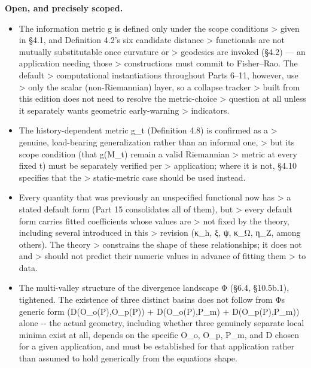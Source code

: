 \documentclass[
]{article}
\begin{document}
\textbf{Open, and precisely scoped.}

\begin{itemize}
\item
  The information metric g is defined only under the scope conditions
  \textgreater{} given in §4.1, and Definition 4.2's six candidate
  distance \textgreater{} functionals are not mutually substitutable
  once curvature or \textgreater{} geodesics are invoked (§4.2) --- an
  application needing those \textgreater{} constructions must commit to
  Fisher--Rao. The default \textgreater{} computational instantiations
  throughout Parts 6--11, however, use \textgreater{} only the scalar
  (non-Riemannian) layer, so a collapse tracker \textgreater{} built
  from this edition does not need to resolve the metric-choice
  \textgreater{} question at all unless it separately wants geometric
  early-warning \textgreater{} indicators.
\item
  The history-dependent metric g\_t (Definition 4.8) is confirmed as a
  \textgreater{} genuine, load-bearing generalization rather than an
  informal one, \textgreater{} but its scope condition (that g(M\_t)
  remain a valid Riemannian \textgreater{} metric at every fixed t) must
  be separately verified per \textgreater{} application; where it is
  not, §4.10 specifies that the \textgreater{} static-metric case should
  be used instead.
\item
  Every quantity that was previously an unspecified functional now has
  \textgreater{} a stated default form (Part 15 consolidates all of
  them), but \textgreater{} every default form carries fitted
  coefficients whose values are \textgreater{} not fixed by the theory,
  including several introduced in this \textgreater{} revision (κ\_h, ξ,
  ψ, κ\_Ω, η\_Z, among others). The theory \textgreater{} constrains the
  shape of these relationships; it does not and \textgreater{} should
  not predict their numeric values in advance of fitting them
  \textgreater{} to data.
\item
  The multi-valley structure of the divergence landscape Φ (§6.4,
  §10.5b.1), tightened. The existence of three distinct basins does not
  follow from Φ\textquotesingle s generic form (D(O\_o(P),O\_p(P)) +
  D(O\_o(P),P\_m) + D(O\_p(P),P\_m)) alone -\/- the actual geometry,
  including whether three genuinely separate local minima exist at all,
  depends on the specific O\_o, O\_p, P\_m, and D chosen for a given
  application, and must be established for that application rather than
  assumed to hold generically from the equation\textquotesingle s shape.

\end{itemize}
\end{document}
